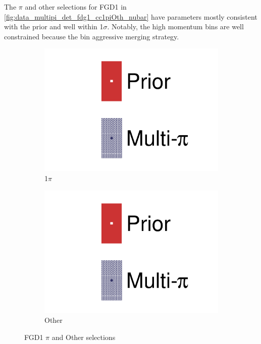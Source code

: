 The $\pi$ and other selections for FGD1 in \autoref{fig:data_multipi_det_fdg1_cc1piOth_nubar} have parameters mostly consistent with the prior and well within 1$\sigma$. Notably, the high momentum bins are well constrained because the bin aggressive merging strategy. 
\begin{figure}[h]
	\centering
	\begin{subfigure}[t]{0.32\textwidth}
		\includegraphics[width=\textwidth,page=46, trim={0mm 0mm 0mm 0mm}, clip]{figures/mach3/2018/data/2018a_FixedCov_RedCov_Mpi_Data_merge_drawPar_withDet}
		\caption{1$\pi$}
	\end{subfigure}
	\begin{subfigure}[t]{0.32\textwidth}
		\includegraphics[width=\textwidth,page=47, trim={0mm 0mm 0mm 0mm}, clip]{figures/mach3/2018/data/2018a_FixedCov_RedCov_Mpi_Data_merge_drawPar_withDet}
		\caption{Other}
	\end{subfigure}
	\caption{FGD1 $\pi$ and Other selections}
	\label{fig:data_multipi_det_fdg1_cc1piOth_nubar}
\end{figure}

